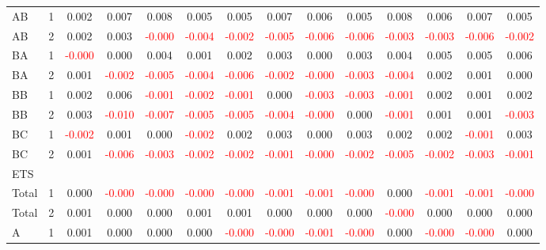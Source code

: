 \begin{table}[!htb]
{\begin{tabular}{llcccccccccccc}
AB & 1 & 0.002 & 0.007 & 0.008 & 0.005 & 0.005 & 0.007 & 0.006 & 0.005 & 0.008 & 0.006 & 0.007 & 0.005\\
AB & 2 & 0.002 & 0.003 & \textcolor{red}{-0.000} & \textcolor{red}{-0.004} & \textcolor{red}{-0.002} & \textcolor{red}{-0.005} & \textcolor{red}{-0.006} & \textcolor{red}{-0.006} & \textcolor{red}{-0.003} & \textcolor{red}{-0.003} & \textcolor{red}{-0.006} & \textcolor{red}{-0.002}\\
BA & 1 & \textcolor{red}{-0.000} & 0.000 & 0.004 & 0.001 & 0.002 & 0.003 & 0.000 & 0.003 & 0.004 & 0.005 & 0.005 & 0.006\\
BA & 2 & 0.001 & \textcolor{red}{-0.002} & \textcolor{red}{-0.005} & \textcolor{red}{-0.004} & \textcolor{red}{-0.006} & \textcolor{red}{-0.002} & \textcolor{red}{-0.000} & \textcolor{red}{-0.003} & \textcolor{red}{-0.004} & 0.002 & 0.001 & 0.000\\
BB & 1 & 0.002 & 0.006 & \textcolor{red}{-0.001} & \textcolor{red}{-0.002} & \textcolor{red}{-0.001} & 0.000 & \textcolor{red}{-0.003} & \textcolor{red}{-0.003} & \textcolor{red}{-0.001} & 0.002 & 0.001 & 0.002\\
BB & 2 & 0.003 & \textcolor{red}{-0.010} & \textcolor{red}{-0.007} & \textcolor{red}{-0.005} & \textcolor{red}{-0.005} & \textcolor{red}{-0.004} & \textcolor{red}{-0.000} & 0.000 & \textcolor{red}{-0.001} & 0.001 & 0.001 & \textcolor{red}{-0.003}\\
BC & 1 & \textcolor{red}{-0.002} & 0.001 & 0.000 & \textcolor{red}{-0.002} & 0.002 & 0.003 & 0.000 & 0.003 & 0.002 & 0.002 & \textcolor{red}{-0.001} & 0.003\\
BC & 2 & 0.001 & \textcolor{red}{-0.006} & \textcolor{red}{-0.003} & \textcolor{red}{-0.002} & \textcolor{red}{-0.002} & \textcolor{red}{-0.001} & \textcolor{red}{-0.000} & \textcolor{red}{-0.002} & \textcolor{red}{-0.005} & \textcolor{red}{-0.002} & \textcolor{red}{-0.003} & \textcolor{red}{-0.001}\\
\hline
ETS &  &  &  &  &  &  &  &  &  &  &  &  & \\
\hline
Total & 1 & 0.000 & \textcolor{red}{-0.000} & \textcolor{red}{-0.000} & \textcolor{red}{-0.000} & \textcolor{red}{-0.000} & \textcolor{red}{-0.001} & \textcolor{red}{-0.001} & \textcolor{red}{-0.000} & 0.000 & \textcolor{red}{-0.001} & \textcolor{red}{-0.001} & \textcolor{red}{-0.000}\\
Total & 2 & 0.001 & 0.000 & 0.000 & 0.001 & 0.001 & 0.000 & 0.000 & 0.000 & \textcolor{red}{-0.000} & 0.000 & 0.000 & 0.000\\
A & 1 & 0.001 & 0.000 & 0.000 & 0.000 & \textcolor{red}{-0.000} & \textcolor{red}{-0.000} & \textcolor{red}{-0.001} & \textcolor{red}{-0.000} & 0.000 & \textcolor{red}{-0.000} & \textcolor{red}{-0.000} & 0.000\\

\end{tabular}}
\end{table}
